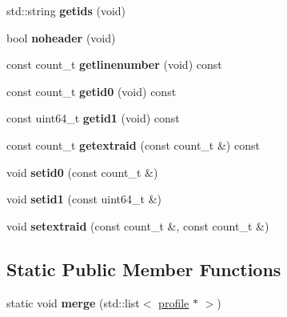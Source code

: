 \begin{DoxyCompactItemize}
\item 
\hypertarget{classmapfile_aec3adcb395d0fe12291e3593bc3412a7}{std\-::string {\bfseries getids} (void)}\label{classmapfile_aec3adcb395d0fe12291e3593bc3412a7}

\item 
\hypertarget{classmapfile_aa4a81f00a86b7f0824750b27c0fb8e7d}{bool {\bfseries noheader} (void)}\label{classmapfile_aa4a81f00a86b7f0824750b27c0fb8e7d}

\item 
\hypertarget{classmapfile_ab4343c2b65a3b4598a3e08217f4b2465}{const count\-\_\-t {\bfseries getlinenumber} (void) const }\label{classmapfile_ab4343c2b65a3b4598a3e08217f4b2465}

\item 
\hypertarget{classmapfile_a691f2dc007baa958bb1807f0b392cd75}{const count\-\_\-t {\bfseries getid0} (void) const }\label{classmapfile_a691f2dc007baa958bb1807f0b392cd75}

\item 
\hypertarget{classmapfile_a77527432903ab4e7e00ec87d5cc134a0}{const uint64\-\_\-t {\bfseries getid1} (void) const }\label{classmapfile_a77527432903ab4e7e00ec87d5cc134a0}

\item 
\hypertarget{classmapfile_ac20ebd1ef0968cdbbc8333f7978eff0c}{const count\-\_\-t {\bfseries getextraid} (const count\-\_\-t \&) const }\label{classmapfile_ac20ebd1ef0968cdbbc8333f7978eff0c}

\item 
\hypertarget{classmapfile_a735402ee4da246cd6900d83913782bc6}{void {\bfseries setid0} (const count\-\_\-t \&)}\label{classmapfile_a735402ee4da246cd6900d83913782bc6}

\item 
\hypertarget{classmapfile_a3c9dd1684f3248c4fed3385fd1c89896}{void {\bfseries setid1} (const uint64\-\_\-t \&)}\label{classmapfile_a3c9dd1684f3248c4fed3385fd1c89896}

\item 
\hypertarget{classmapfile_a3b4b26e79ba38568a214952e31579cba}{void {\bfseries setextraid} (const count\-\_\-t \&, const count\-\_\-t \&)}\label{classmapfile_a3b4b26e79ba38568a214952e31579cba}

\end{DoxyCompactItemize}
\subsection*{Static Public Member Functions}
\begin{DoxyCompactItemize}
\item 
\hypertarget{classmapfile_a992d5934ea26fd0a0934f53f69aa2164}{static void {\bfseries merge} (std\-::list$<$ \hyperlink{classprofile}{profile} $\ast$ $>$)}\label{classmapfile_a992d5934ea26fd0a0934f53f69aa2164}

\end{DoxyCompactItemize}
